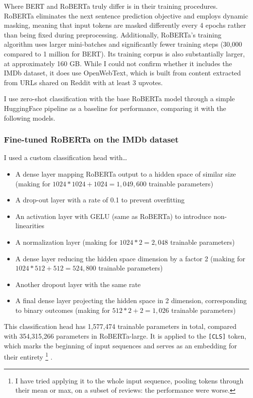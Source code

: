 \documentclass{article}
\begin{document}
Where BERT and RoBERTa truly differ is in their training procedures. RoBERTa eliminates the next sentence prediction objective and employs dynamic masking, meaning that input tokens are masked differently every 4 epochs rather than being fixed during preprocessing. Additionally, RoBERTa's training algorithm uses larger mini-batches and significantly fewer training steps (30,000 compared to 1 million for BERT). Its training corpus is also substantially larger, at approximately 160 GB. While I could not confirm whether it includes the IMDb dataset, it does use OpenWebText, which is built from content extracted from URLs shared on Reddit with at least 3 upvotes.

I use zero-shot classification with the base RoBERTa model through a simple HuggingFace pipeline as a baseline for performance, comparing it with the following models.

\subsubsection{Fine-tuned RoBERTa on the IMDb dataset}

I used a custom classification head with… 
\begin{itemize}
    \item A dense layer mapping RoBERTa output to a hidden space of similar size (making for \( 1024*1024+1024=1,049,600 \) trainable parameters)
	\item A drop-out layer with a rate of 0.1 to prevent overfitting
	\item An activation layer with GELU (same as RoBERTa) to introduce non-linearities
	\item A normalization layer (making for \( 1024*2=2,048 \) trainable parameters)
	\item A dense layer reducing the hidden space dimension by a factor 2 (making for \(1024*512+512=524,800\) trainable parameters)
	\item Another dropout layer with the same rate
	\item A final dense layer projecting the hidden space in 2 dimension, corresponding to binary outcomes (making for \(512*2+2=1,026\) trainable parameters)
\end{itemize}
This classification head has 1,577,474 trainable parameters in total, compared with 354,315,266 parameters in RoBERTa-large. It is applied to the \texttt{[CLS]} token, which marks the beginning of input sequences and serves as an embedding for their entirety
\footnote{I have tried applying it to the whole input sequence, pooling tokens through their mean or max, on a subset of reviews: the performance were worse.}
.
\end{document}
